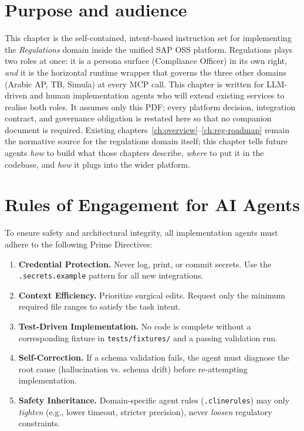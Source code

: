 \documentclass[11pt,a4paper,twoside]{report}
\begin{document}
\section{Purpose and audience}
This chapter is the self-contained, intent-based instruction set for
implementing the \emph{Regulations} domain inside the unified SAP
OSS platform. Regulations plays two roles at once: it is a persona
surface (Compliance Officer) in its own right, \emph{and} it is the
horizontal runtime wrapper that governs the three other domains
(Arabic AP, TB, Simula) at every MCP call. This chapter is written
for LLM-driven and human implementation agents who will extend
existing services to realise both roles. It assumes only this PDF;
every platform decision, integration contract, and governance
obligation is restated here so that no companion document is
required. Existing chapters~\ref{ch:overview}--\ref{ch:reg-roadmap}
remain the normative source for the regulations domain itself; this
chapter tells future agents \emph{how} to build what those chapters
describe, \emph{where} to put it in the codebase, and \emph{how} it
plugs into the wider platform.


\section{Rules of Engagement for AI Agents}
\label{sec:agent-rules}

To ensure safety and architectural integrity, all implementation agents must adhere to the following Prime Directives:

\begin{enumerate}[label=\textsc{rule}-\arabic*:, leftmargin=2cm]
\item \textbf{Credential Protection.} Never log, print, or commit secrets. Use the \texttt{.secrets.example} pattern for all new integrations.
\item \textbf{Context Efficiency.} Prioritize surgical edits. Request only the minimum required file ranges to satisfy the task intent.
\item \textbf{Test-Driven Implementation.} No code is complete without a corresponding fixture in \texttt{tests/fixtures/} and a passing validation run.
\item \textbf{Self-Correction.} If a schema validation fails, the agent must diagnose the root cause (hallucination vs. schema drift) before re-attempting implementation.
\item \textbf{Safety Inheritance.} Domain-specific agent rules (\texttt{.clinerules}) may only \emph{tighten} (e.g., lower timeout, stricter precision), never \emph{loosen} regulatory constraints.
\end{enumerate}
\end{document}
